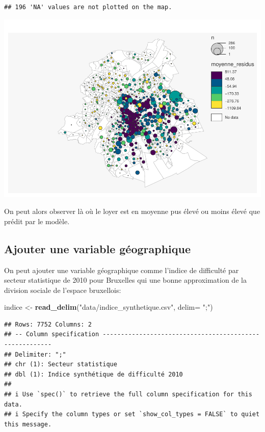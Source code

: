 \documentclass[
]{book}
\newenvironment{Shaded}{\begin{snugshade}}{\end{snugshade}}
\newcommand{\AttributeTok}[1]{\textcolor[rgb]{0.13,0.29,0.53}{#1}}
\newcommand{\FunctionTok}[1]{\textcolor[rgb]{0.13,0.29,0.53}{\textbf{#1}}}
\newcommand{\NormalTok}[1]{#1}
\newcommand{\OtherTok}[1]{\textcolor[rgb]{0.56,0.35,0.01}{#1}}
\newcommand{\StringTok}[1]{\textcolor[rgb]{0.31,0.60,0.02}{#1}}
\begin{document}
\begin{verbatim}
## 196 'NA' values are not plotted on the map.
\end{verbatim}

\includegraphics{bookdown-demo_files/figure-latex/unnamed-chunk-28-1.pdf}

On peut alors observer là où le loyer est en moyenne pus élevé ou moins
élevé que prédit par le modèle.

\hypertarget{ajouter-une-variable-guxe9ographique}{%
\subsection{Ajouter une variable géographique}\label{ajouter-une-variable-guxe9ographique}}

On peut ajouter une variable géographique comme l'indice de difficulté
par secteur statistique de 2010 pour Bruxelles qui une bonne
approximation de la division sociale de l'espace bruxellois:

\begin{Shaded}
\begin{Highlighting}[]
\NormalTok{indice }\OtherTok{\textless{}{-}} \FunctionTok{read\_delim}\NormalTok{(}\StringTok{"data/indice\_synthetique.csv"}\NormalTok{, }\AttributeTok{delim=} \StringTok{";"}\NormalTok{)}
\end{Highlighting}
\end{Shaded}

\begin{verbatim}
## Rows: 7752 Columns: 2
## -- Column specification --------------------------------------------------------
## Delimiter: ";"
## chr (1): Secteur statistique
## dbl (1): Indice synthétique de difficulté 2010
## 
## i Use `spec()` to retrieve the full column specification for this data.
## i Specify the column types or set `show_col_types = FALSE` to quiet this message.
\end{verbatim}
\end{document}
